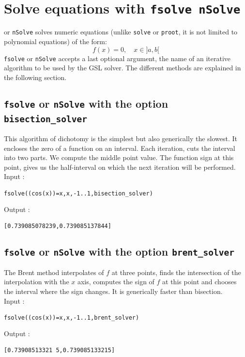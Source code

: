 \documentclass[a4paper,11pt]{book}
\begin{document}
\section{Solve equations with {\tt fsolve nSolve}}
 or {\tt nSolve} solves numeric equations
(unlike {\tt solve} or {\tt proot}, it is not limited to polynomial 
equations) of the form:
\[ f(x)=0, \quad x \in ]a,b[ \]
{\tt fsolve} or {\tt nSolve} accepts a last optional argument,
the name of an iterative algorithm to be used by the GSL solver.
The different methods are explained in the following section.

\subsection{{\tt fsolve} or {\tt nSolve} with the option {\tt bisection\_solver}}
This algorithm of dichotomy is the simplest but also generically
the slowest. 
It encloses the zero of a function on an interval. 
Each iteration, cuts the interval into two parts. We compute the middle point 
value. The function sign at this point, gives us the half-interval 
on which the next iteration will be performed.\\
Input :
\begin{center}{\tt fsolve((cos(x))=x,x,-1..1,bisection\_solver)}\end{center}
Output :
\begin{center}{\tt [0.739085078239,0.739085137844]}\end{center}

\subsection{{\tt fsolve} or {\tt nSolve} with the option {\tt brent\_solver}}
The Brent method interpolates of $f$ at three points, finds
the intersection of the interpolation with the $x$ axis, computes
the sign of $f$ at this point and chooses the interval where the sign changes.
It is generically faster than bisection.\\
Input :
\begin{center}{\tt fsolve((cos(x))=x,x,-1..1,brent\_solver)}\end{center}
Output :
\begin{center}{\tt [0.73908513321 5,0.739085133215]}\end{center}
\end{document}
